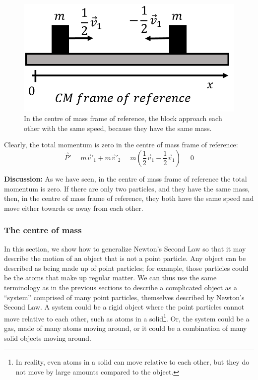 \begin{framed}
\begin{framed}
\begin{figure}[!htbp]
\centering
\includegraphics[width=0.4\linewidth]{files/cmframe-e97482a4cf5f187af2d422a8562db512.png}
\caption[]{In the centre of mass frame of reference, the block approach each other with the same speed, because they have the same mass.}
\label{fig:momentumandcm:cmframe}
\end{figure}

Clearly, the total momentum is zero in the centre of mass frame of reference:
\begin{equation}
\vec P' = m\vec v'_1+ m\vec v'_2 = m \left(\frac{1}{2}\vec v_1 - \frac{1}{2}\vec v_1\right) = 0
\end{equation}

\textbf{Discussion:} As we have seen, in the centre of mass frame of reference the total momentum is zero. If there are only two particles, and they have the same mass, then, in the centre of mass frame of reference, they both have the same speed and move either towards or away from each other.
\end{framed}
\end{framed}

\subsubsection{The centre of mass}

In this section, we show how to generalize Newton's Second Law so that it may describe the motion of an object that is not a point particle. Any object can be described as being made up of point particles; for example, those particles could be the atoms that make up regular matter. We can thus use the same terminology as in the previous sections to describe a complicated object as a ``system'' comprised of many point particles, themselves described by Newton's Second Law. A system could be a rigid object where the point particles cannot move relative to each other, such as atoms in a solid\footnote{In reality, even atoms in a solid can move relative to each other, but they do not move by large amounts compared to the object.}. Or, the system could be a gas, made of many atoms moving around, or it could be a combination of many solid objects moving around.

